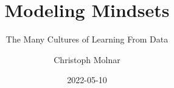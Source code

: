 \documentclass[
  10pt,
]{scrbook}
\title{Modeling Mindsets}
\subtitle{The Many Cultures of Learning From Data}
\author{Christoph Molnar}
\date{2022-05-10}
\begin{document}
\maketitle

\thispagestyle{empty}

\end{document}
